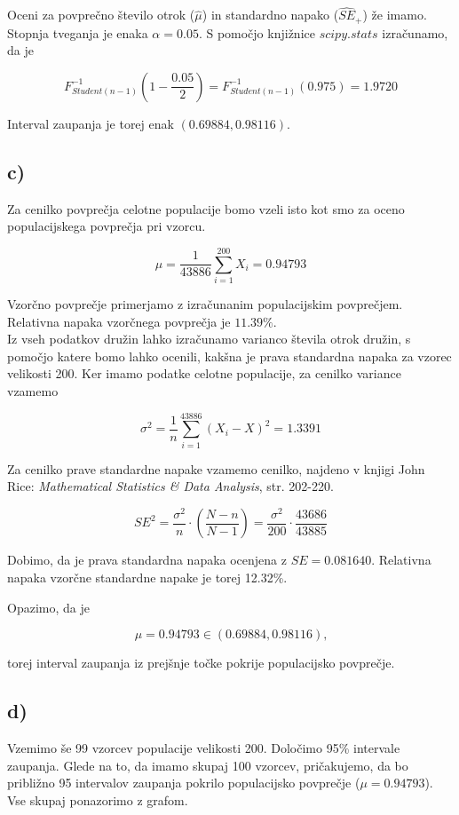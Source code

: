 \documentclass[12pt, a4paper]{article}
\begin{document}
Oceni za povprečno število otrok ($\hat{\mu}$) in standardno napako ($\widehat{SE}_+$) 
že imamo. Stopnja tveganja je enaka $\alpha = 0.05$. S pomočjo knjižnice $scipy.stats$ izračunamo, da je 

$$ F^{-1}_{Student(n-1)}(1 - \frac{0.05}{2}) = F^{-1}_{Student(n-1)}(0.975) = 1.9720
$$

Interval zaupanja je torej enak $(0.69884, 0.98116)$.

\subsection*{c)}

Za cenilko povprečja celotne populacije bomo vzeli isto kot smo za oceno populacijskega
povprečja pri vzorcu. 

$$ \mu = \frac{1}{43886}\sum^{200}_{i=1} X_i = 0.94793
$$

Vzorčno povprečje primerjamo z izračunanim populacijskim povprečjem. Relativna
 napaka vzorčnega povprečja je $11.39\%$. \\

Iz vseh podatkov družin lahko izračunamo varianco števila otrok družin, s pomočjo
katere bomo lahko ocenili, kakšna je prava standardna napaka za vzorec velikosti 200.
Ker imamo podatke celotne populacije, za cenilko variance vzamemo

$$ \sigma^2 = \frac{1}{n} \sum_{i=1}^{43886} (X_i - X)^2 = 1.3391
$$

Za cenilko prave standardne napake vzamemo cenilko, najdeno v knjigi John Rice:
\emph{Mathematical Statistics \& Data Analysis}, str. 202-220. 

$$ SE^2 = \frac{\sigma^2}{n} \cdot (\frac{N-n}{N-1}) = \frac{\sigma^2}{200} \cdot \frac{43686}{43885}
$$

Dobimo, da je prava standardna napaka ocenjena z $SE = 0.081640$. Relativna napaka
vzorčne standardne napake je torej 12.32\%.

Opazimo, da je

$$ \mu = 0.94793 \in (0.69884, 0.98116) \text{,}
$$

torej interval zaupanja iz prejšnje točke pokrije populacijsko povprečje.

\subsection*{d)}

Vzemimo še 99 vzorcev populacije velikosti 200. Določimo 95\% intervale zaupanja. 
Glede na to, da imamo skupaj 100
vzorcev, pričakujemo, da bo približno 95 intervalov zaupanja pokrilo populacijsko
povprečje ($\mu = 0.94793$). Vse skupaj ponazorimo z grafom.
\end{document}
